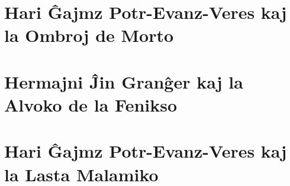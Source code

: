 \part{Hari Ĝajmz Potr-Evanz-Veres kaj la Ombroj de Morto}
% 
% 
% 
% 
% 
% 
% 

% 
% 
% 
% 
% 
% 
% 
% 
% 
% 
% 
% 
% 
% 
% 
% 
% 
% 
\part{Hermajni Ĵin Granĝer kaj la Alvoko de la Fenikso}
% 
% 
% 
% 
% 
% 
% 
% 
% 
% 
% 
% 
% 
% 
% 
% 
% 
% 
% 
% 
% 
\part{Hari Ĝajmz Potr-Evanz-Veres kaj la Lasta Malamiko}
% 
% 
% 
% 
% 
% 
% 
% 
% 
% 
% 
% 
% 

